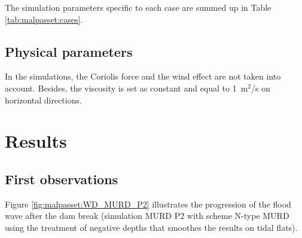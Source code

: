 The simulation parameters specific to each case are summed up in Table \ref{tab:malpasset:cases}.
\begin{table}[H]
  \caption{List of the simulation parameters used for the four cases tested in the Malpasset example.}
  \label{tab:malpasset:cases}
\end{table}

\subsection{Physical parameters}
In the simulations, the Coriolis force and the wind effect are not taken into account. Besides, the viscosity is set as constant and equal to 1~m$^2$/s on horizontal directions.

\section{Results}

\subsection{First observations}
Figure \ref{fig:malpasset:WD_MURD_P2} illustrates the progression of the flood wave after the dam
break (simulation MURD P2 with scheme N-type MURD using the treatment of negative depths that
smoothes the results on tidal flats). %

